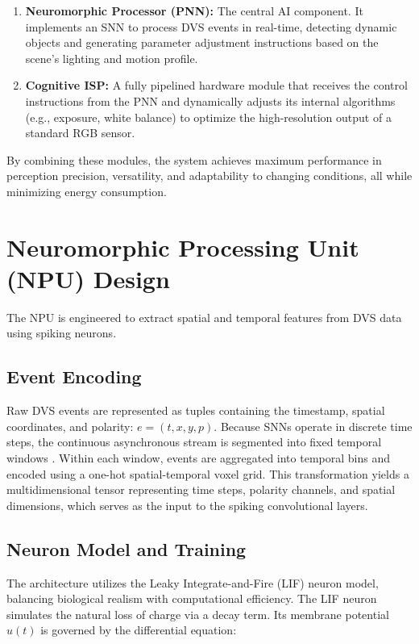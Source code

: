 \documentclass[conference]{IEEEtran}
\begin{document}
\begin{enumerate}
    \item \textbf{Neuromorphic Processor (PNN):} The central AI component. It implements an SNN to process DVS events in real-time, detecting dynamic objects and generating parameter adjustment instructions based on the scene's lighting and motion profile.
    \item \textbf{Cognitive ISP:} A fully pipelined hardware module that receives the control instructions from the PNN and dynamically adjusts its internal algorithms (e.g., exposure, white balance) to optimize the high-resolution output of a standard RGB sensor.
\end{enumerate}

By combining these modules, the system achieves maximum performance in perception precision, versatility, and adaptability to changing conditions, all while minimizing energy consumption.

\section{Neuromorphic Processing Unit (NPU) Design}
The NPU is engineered to extract spatial and temporal features from DVS data using spiking neurons.

\subsection{Event Encoding}
Raw DVS events are represented as tuples containing the timestamp, spatial coordinates, and polarity: $e = (t, x, y, p)$. Because SNNs operate in discrete time steps, the continuous asynchronous stream is segmented into fixed temporal windows \cite{detournemire2020}. Within each window, events are aggregated into temporal bins and encoded using a one-hot spatial-temporal voxel grid. This transformation yields a multidimensional tensor representing time steps, polarity channels, and spatial dimensions, which serves as the input to the spiking convolutional layers.

\subsection{Neuron Model and Training}
The architecture utilizes the Leaky Integrate-and-Fire (LIF) neuron model, balancing biological realism with computational efficiency. The LIF neuron simulates the natural loss of charge via a decay term. Its membrane potential $u(t)$ is governed by the differential equation:
\end{document}
